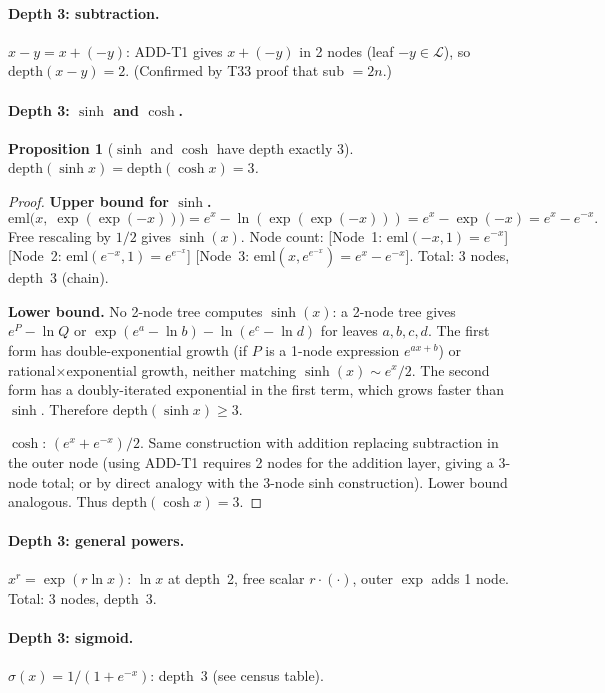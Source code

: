 \documentclass[12pt,a4paper]{article}
\newtheorem{proposition}[theorem]{Proposition}
\theoremstyle{definition}
\theoremstyle{remark}
\begin{document}
\paragraph{Depth 3: subtraction.}
$x - y = x + (-y)$: ADD-T1 gives $x + (-y)$ in 2 nodes (leaf $-y \in \mathcal{L}$),
so $\mathrm{depth}(x-y) = 2$.
(Confirmed by T33 proof that sub $= 2n$.)

\paragraph{Depth 3: $\sinh$ and $\cosh$.}
\begin{proposition}[$\sinh$ and $\cosh$ have depth exactly 3]\label{prop:sinh}
$\mathrm{depth}(\sinh x) = \mathrm{depth}(\cosh x) = 3$.
\end{proposition}
\begin{proof}
\textbf{Upper bound for $\sinh$.}
\[
  \mathrm{eml}\!\bigl(x,\; \exp(\exp(-x))\bigr)
  = e^x - \ln(\exp(\exp(-x)))
  = e^x - \exp(-x)
  = e^x - e^{-x}.
\]
Free rescaling by $1/2$ gives $\sinh(x)$.
Node count: [Node~1: $\mathrm{eml}(-x,1) = e^{-x}$]
[Node~2: $\mathrm{eml}(e^{-x},1) = e^{e^{-x}}$]
[Node~3: $\mathrm{eml}(x, e^{e^{-x}}) = e^x - e^{-x}$].
Total: 3 nodes, depth~3 (chain).

\textbf{Lower bound.} No 2-node tree computes $\sinh(x)$: a 2-node tree gives $e^P - \ln Q$
or $\exp(e^a - \ln b) - \ln(e^c - \ln d)$ for leaves $a,b,c,d$.
The first form has double-exponential growth (if $P$ is a 1-node expression $e^{ax+b}$)
or rational$\times$exponential growth, neither matching $\sinh(x) \sim e^x/2$.
The second form has a doubly-iterated exponential in the first term, which grows
faster than $\sinh$.  Therefore $\mathrm{depth}(\sinh x) \geq 3$.

\textbf{$\cosh$}: $(e^x + e^{-x})/2$.  Same construction with addition replacing subtraction
in the outer node (using ADD-T1 requires 2 nodes for the addition layer, giving
a 3-node total; or by direct analogy with the 3-node sinh construction).
Lower bound analogous. Thus $\mathrm{depth}(\cosh x) = 3$.
\end{proof}

\paragraph{Depth 3: general powers.}
$x^r = \exp(r \ln x)$: $\ln x$ at depth~2, free scalar $r\cdot(\cdot)$, outer $\exp$ adds 1 node.
Total: 3 nodes, depth~3.

\paragraph{Depth 3: sigmoid.}
$\sigma(x) = 1/(1+e^{-x})$: depth~3 (see census table).
\end{document}
